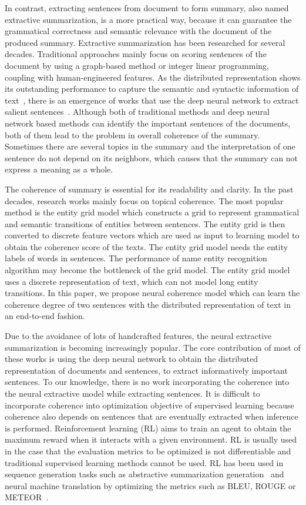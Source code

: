 \documentclass[letterpaper]{article} %
\begin{document}
	In contrast, extracting sentences from document to form summary, also named extractive summarization, is a more practical way, because it can guarantee the grammatical correctness and semantic relevance with the document of the produced summary. Extractive summarization has been researched for several decades. Traditional approaches mainly focus on scoring sentences of the document by using a graph-based method or integer linear programming, coupling with human-engineered features. As the distributed representation shows its outstanding performance to capture the semantic and syntactic information of text~\cite{word2vec,nc_baotian}, there is an emergence of works that use the deep neural network to extract salient sentences~\cite{SummaRuNNer,nayeem2017extract,jianpeng2016}. Although both of traditional methods and deep neural network based methods can identify the important sentences of the documents, both of them lead to the problem in overall coherence of the summary. Sometimes there are several topics in the summary and the interpretation of one sentence do not depend on its neighbors, which causes that the summary can not express a meaning as a whole. 
	
	The coherence of summary is essential for its readability and clarity. In the past decades, research works mainly focus on topical coherence. The most popular method is the entity grid model\cite{entitygrid} which constructs a grid to represent grammatical and semantic transitions of entities between sentences. The entity grid is then converted to discrete feature vectors which are used as input to learning model to obtain the coherence score of the texts\cite{nlcm}. The entity grid model needs the entity labels of words in sentences. The performance of name entity recognition algorithm may become the bottleneck of the grid model. The entity grid model uses a discrete representation of text, which can not model long entity transitions. In this paper, we propose neural coherence model which can learn the coherence degree of two sentences with the distributed representation of text in an end-to-end fashion.
	
	
	Due to the avoidance of lots of handcrafted features, the neural extractive summarization is becoming increasingly popular.  The core contribution of most of these works is using the deep neural network to obtain the distributed representation of documents and sentences, to extract informatively important sentences\cite{jianpeng2016}. To our knowledge, there is no work incorporating the coherence into the neural extractive model while extracting sentences. It is difficult to incorporate coherence into optimization objective of supervised learning because coherence also depends on sentences that are eventually extracted when inference is performed. Reinforcement learning (RL) aims to train an agent to obtain the maximum reward when it interacts with a given environment. RL is usually used in the case that the evaluation metrics to be optimized is not differentiable and traditional supervised learning methods cannot be used. RL has been used in sequence generation tasks such as abstractive summarization generation~\cite{socher2017_summarization} and neural machine translation by optimizing the metrics such as BLEU, ROUGE or METEOR~\cite{rl2nmt}.
	
\end{document}
